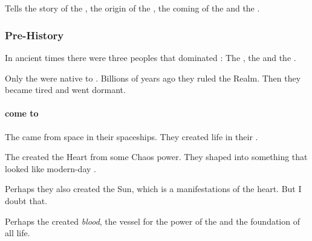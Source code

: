 
\part{\DominatorsofMith}















\chapter{\FirstbanewarBook}
Tells the story of the \ophidians, the origin of the \draecchonosh{}, the coming of the \banes{} and the \firstbanewar. 















\section{Pre-History}
In ancient times there were three peoples that dominated \Miith{}: 
The \krakens, the \xss{} and the \voyagers. 

Only the \krakens{} were native to \Miith{}. 
Billions of years ago they ruled the Realm. 
Then they became tired and went dormant. 









\subsection{\Voyagers come to \Miith}
The \voyagers{} came from space in their spaceships. 
They created life in their . 

The \voyagers{} created the Heart from some Chaos power. 
They shaped \Miith{} into something that looked like modern-day \Miith{}. 

Perhaps they also created the Sun, which is a manifestations of the heart. 
But I doubt that. 

Perhaps the \voyagers{} created \emph{blood}, the vessel for the power of the  and the foundation of all \Miithian{} life. 

